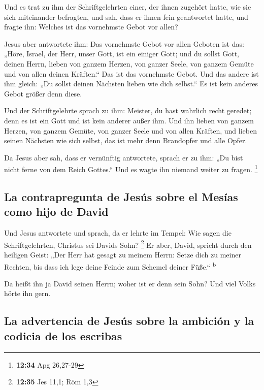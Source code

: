 Und es trat zu ihm der Schriftgelehrten einer, der ihnen
zugehört hatte, wie sie sich miteinander befragten, und sah, dass er
ihnen fein geantwortet hatte, und fragte ihn: Welches ist das vornehmste
Gebot vor allen?

 Jesus aber antwortete ihm: Das vornehmste Gebot vor
allen Geboten ist das: „Höre, Israel, der Herr, unser Gott, ist ein
einiger Gott;  und du sollst Gott, deinen Herrn, lieben
von ganzem Herzen, von ganzer Seele, von ganzem Gemüte und von allen
deinen Kräften.`` Das ist das vornehmste Gebot.  Und das
andere ist ihm gleich: „Du sollst deinen Nächsten lieben wie dich
selbst.`` Es ist kein anderes Gebot größer denn diese.

 Und der Schriftgelehrte sprach zu ihm: Meister, du hast
wahrlich recht geredet; denn es ist ein Gott und ist kein anderer außer
ihm.  Und ihn lieben von ganzem Herzen, von ganzem
Gemüte, von ganzer Seele und von allen Kräften, und lieben seinen
Nächsten wie sich selbst, das ist mehr denn Brandopfer und alle Opfer.

 Da Jesus aber sah, dass er vernünftig antwortete, sprach
er zu ihm: „Du bist nicht ferne von dem Reich Gottes.`` Und es wagte ihn
niemand weiter zu fragen. \footnote{\textbf{12:34} Apg 26,27-29}

\hypertarget{la-contrapregunta-de-jesuxfas-sobre-el-mesuxedas-como-hijo-de-david}{%
\subsection{La contrapregunta de Jesús sobre el Mesías como hijo de
David}\label{la-contrapregunta-de-jesuxfas-sobre-el-mesuxedas-como-hijo-de-david}}

 Und Jesus antwortete und sprach, da er lehrte im Tempel:
Wie sagen die Schriftgelehrten, Christus sei Davids Sohn? \footnote{\textbf{12:35}
  Jes 11,1; Röm 1,3}  Er aber, David, spricht durch den
heiligen Geist: „Der Herr hat gesagt zu meinem Herrn: Setze dich zu
meiner Rechten, bis dass ich lege deine Feinde zum Schemel deiner
Füße.`` \textsuperscript{b}

 Da heißt ihn ja David seinen Herrn; woher ist er denn
sein Sohn? Und viel Volks hörte ihn gern.

\hypertarget{la-advertencia-de-jesuxfas-sobre-la-ambiciuxf3n-y-la-codicia-de-los-escribas}{%
\subsection{La advertencia de Jesús sobre la ambición y la codicia de
los
escribas}\label{la-advertencia-de-jesuxfas-sobre-la-ambiciuxf3n-y-la-codicia-de-los-escribas}}

